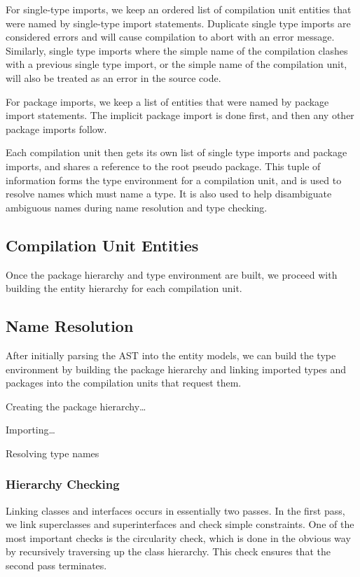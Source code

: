 \documentclass[pdftex,11pt,a4paper]{article}
\begin{document}
For single-type imports, we keep an ordered list of compilation unit
entities that were named by single-type import statements. Duplicate
single type imports are considered errors and will cause compilation
to abort with an error message. Similarly, single type imports where
the simple name of the compilation clashes with a previous single type
import, or the simple name of the compilation unit, will also be
treated as an error in the source code.

For package imports, we keep a list of  entities that
were named by package import statements. The implicit
 package import is done first, and then any other
package imports follow.

Each compilation unit then gets its own list of single type imports
and package imports, and shares a reference to the root pseudo
package. This tuple of information forms the type environment for a
compilation unit, and is used to resolve names which must name a
type. It is also used to help disambiguate ambiguous names during name
resolution and type checking.

\subsection{Compilation Unit Entities}

Once the package hierarchy and type environment are built, we proceed
with building the entity hierarchy for each compilation unit.


\subsection{Name Resolution}

After initially parsing the AST into the entity models, we can build
the type environment by building the package hierarchy and linking
imported types and packages into the compilation units that request
them.

Creating the package hierarchy\ldots

Importing\ldots

Resolving type names



\subsubsection{Hierarchy Checking}

Linking classes and interfaces occurs in essentially two passes. In
the first pass, we link superclasses and superinterfaces and check
simple constraints. One of the most important checks is the
circularity check, which is done in the obvious way by recursively
traversing up the class hierarchy. This check ensures that the second
pass terminates.
\end{document}

